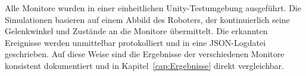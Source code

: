 Alle Monitore wurden in einer einheitlichen Unity-Testumgebung ausgeführt.
Die Simulationen basieren auf einem Abbild des Roboters, der
kontinuierlich seine Gelenkwinkel und Zustände an die Monitore übermittelt.
Die erkannten Ereignisse werden unmittelbar protokolliert und in eine
JSON-Logdatei geschrieben. Auf diese Weise sind die Ergebnisse der
verschiedenen Monitore konsistent dokumentiert und in
Kapitel~\ref{cap:Ergebnisse} direkt vergleichbar.
